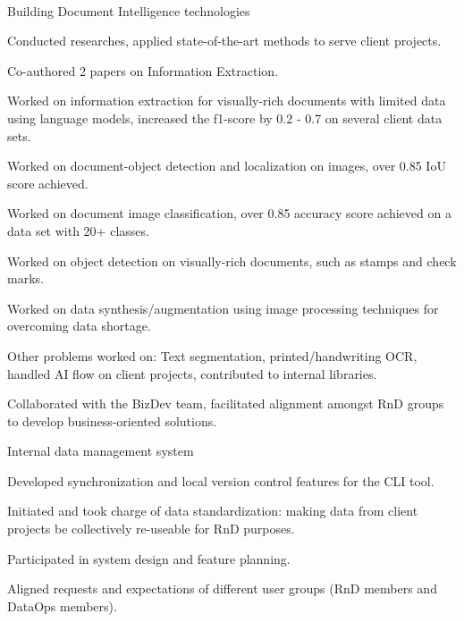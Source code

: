 \\
\begin{xitemize}
    \item Building Document Intelligence technologies
    \begin{zitemize}
        \item Conducted researches, applied state-of-the-art methods to serve client projects.
        \item Co-authored 2 papers on Information Extraction.
        \item Worked on information extraction for visually-rich documents with limited data using language models, increased the f1-score by 0.2 - 0.7 on several client data sets.
        \item Worked on document-object detection and localization on images, over 0.85 IoU score achieved.
        \item Worked on document image classification, over 0.85 accuracy score achieved on a data set with 20+ classes.
        \item Worked on object detection on visually-rich documents, such as stamps and check marks.
        \item Worked on data synthesis/augmentation using image processing techniques for overcoming data shortage.
        \item Other problems worked on: Text segmentation, printed/handwriting OCR, handled AI flow on client projects, contributed to internal libraries.
        \item Collaborated with the BizDev team, facilitated alignment amongst RnD groups to develop business-oriented solutions.
    \end{zitemize}
    \item Internal data management system
    \begin{zitemize}
        \item Developed synchronization and local version control features for the CLI tool.
        \item Initiated and took charge of data standardization: making data from client projects be collectively re-useable for RnD purposes.
        \item Participated in system design and feature planning.
        \item Aligned requests and expectations of different user groups (RnD members and DataOps members).

\end{zitemize}
\end{xitemize}
